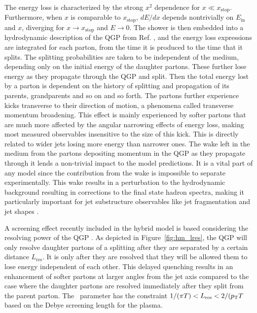 The energy loss is characterized by the strong  $x^2$ dependence for $x \ll x_\mathrm{stop}$.
Furthermore, when $x$ is comparable to $x_\mathrm{stop}$, $dE/dx$ depends nontrivially on $E_\mathrm{in}$ and $x$, diverging for $x\rightarrow x_\mathrm{stop}$ and $E\rightarrow0$.
The shower is then embedded into a hydrodynamic description of the QGP from Ref.
\cite{Hirano:2010je}, and the energy loss expressions are integrated for each parton, from the time it is produced to the time that it splits.
The splitting probabilities are taken to be independent of the medium, depending only on the initial energy of the daughter partons.
These further lose energy as they propagate through the QGP and split.
Then the total energy lost by a parton is dependent on the history of splitting and propagation of its parents, grandparents and so on and so forth.
The partons further experience kicks transverse to their direction of motion, a phenomena called transverse momentum broadening.
This effect is mainly experienced by softer partons that are much more affected by the angular narrowing effects of energy loss, making most measured observables insensitive to the size of this kick.
This is directly related to wider jets losing more energy than narrower ones.
The wake left in the medium from the partons depositing momentum in the QGP as they propagate through it lends a non-trivial impact to the model predictions.
It is a vital part of any model since the contribution from the wake is impossible to separate experimentally. 
This wake results in a perturbation to the hydrodynamic background resulting in corrections to the final state hadron spectra, making it particularly important for jet substructure observables like jet fragmentation and jet shapes \cite{Casalderrey-Solana:2016jvj}.

A screening effect recently included in the hybrid model is based considering the resolving power of the QGP \cite{Hulcher:2017cpt}.
As depicted in Figure~\ref{fig:hm_lres}, the QGP will only resolve daughter partons of a splitting after they are separated by a certain distance $L_\mathrm{res}$.
It is only after they are resolved that they will be allowed them to lose energy independent of each other.
This delayed quenching results in an enhancement of softer partons at larger angles from the jet axis compared to the case where the daughter partons are resolved immediately after they split from the parent parton.
The \Lres\ parameter has the constraint $ 1/(\pi T) < \mbox{$L_{\mathrm{res}}$} < 2 /(\mbox{$p_{\mathrm{T}}$} T$ based on the Debye screening length for the plasma.

